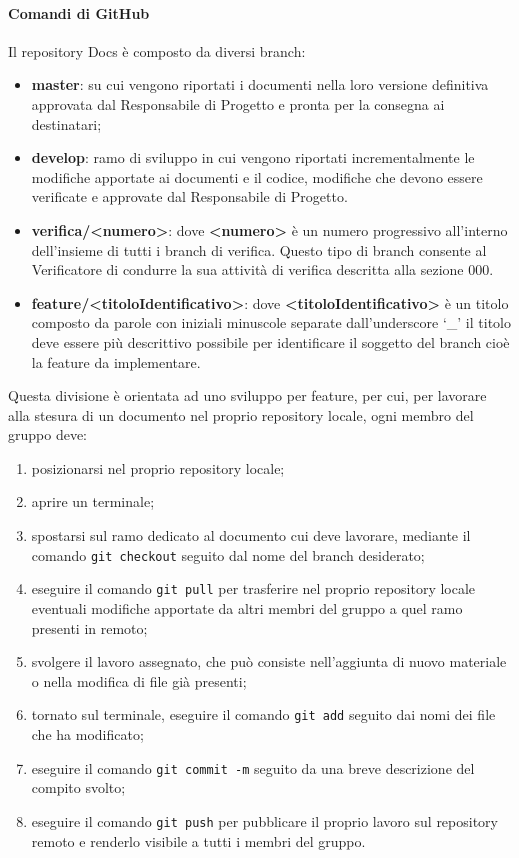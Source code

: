 			\paragraph{Comandi di GitHub}
				Il repository Docs è composto da diversi branch:
				\begin{itemize}
					\item\textbf{master}: su cui vengono riportati i documenti nella loro versione definitiva approvata dal Responsabile di Progetto e pronta per la consegna ai destinatari;
					\item\textbf{develop}: ramo di sviluppo in cui vengono riportati incrementalmente le modifiche apportate ai documenti e il codice, modifiche che devono essere verificate e  approvate dal Responsabile di Progetto.
					\item\textbf{verifica/<numero>}: dove \textbf{<numero>} è un numero progressivo all’interno dell’insieme di tutti i branch di verifica. Questo tipo di branch consente al Verificatore di condurre la sua attività di verifica descritta alla sezione 000.
					\item\textbf{feature/<titoloIdentificativo>}: dove \textbf{<titoloIdentificativo>} è un titolo composto da parole con iniziali minuscole separate dall’underscore ‘\_’ il titolo deve essere più descrittivo possibile per identificare il soggetto del branch cioè la feature da implementare.
				\end{itemize}
				Questa divisione è orientata ad uno sviluppo per feature, per cui, per lavorare alla stesura di un documento nel proprio repository locale, ogni membro del gruppo deve:
				\begin{enumerate}
					\item posizionarsi nel proprio repository locale;
					\item aprire un terminale;
					\item spostarsi sul ramo dedicato al documento cui deve lavorare, mediante il comando \texttt{git checkout} seguito dal nome del branch desiderato;
					\item eseguire il comando \texttt{git pull} per trasferire nel proprio repository locale eventuali modifiche apportate da altri membri del gruppo a quel ramo presenti in remoto;
					\item svolgere il lavoro assegnato, che può consiste nell'aggiunta di nuovo materiale o nella modifica di file già presenti;
					\item tornato sul terminale, eseguire il comando \texttt{git add} seguito dai nomi dei file che ha modificato;
					\item eseguire il comando \texttt{git commit -m} seguito da una breve descrizione del compito svolto;
					\item eseguire il comando \texttt{git push} per pubblicare il proprio lavoro sul repository remoto e renderlo visibile a tutti i membri del gruppo.
				\end{enumerate}

